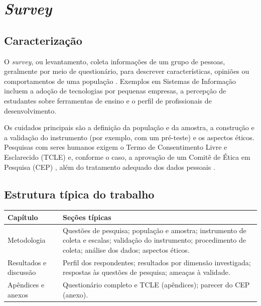 \section{\textit{Survey}}
\label{sec_tipo_survey}

\subsection{Caracterização}

O \textit{survey}, ou levantamento, coleta informações de um grupo de pessoas, geralmente por meio de questionário, para descrever características, opiniões ou comportamentos de uma população \cite{kitchenham2008surveys}. Exemplos em Sistemas de Informação incluem a adoção de tecnologias por pequenas empresas, a percepção de estudantes sobre ferramentas de ensino e o perfil de profissionais de desenvolvimento.

Os cuidados principais são a definição da população e da amostra, a construção e a validação do instrumento (por exemplo, com um pré-teste) e os aspectos éticos. Pesquisas com seres humanos exigem o Termo de Consentimento Livre e Esclarecido (TCLE) e, conforme o caso, a aprovação de um Comitê de Ética em Pesquisa (CEP) \cite{cns2016resolucao510}, além do tratamento adequado dos dados pessoais \cite{brasil2018lgpd}.

\subsection{Estrutura típica do trabalho}

\begin{quadro}[htb]
	\centering
	\caption{Estrutura típica de um TCC de \textit{survey}.}
	\label{qua_estrutura_survey}
	\small
	\begin{tabularx}{\textwidth}{|l|X|}
		\hline
		\textbf{Capítulo} & \textbf{Seções típicas} \\ \hline
		Metodologia & Questões de pesquisa; população e amostra; instrumento de coleta e escalas; validação do instrumento; procedimento de coleta; análise dos dados; aspectos éticos. \\ \hline
		Resultados e discussão & Perfil dos respondentes; resultados por dimensão investigada; respostas às questões de pesquisa; ameaças à validade. \\ \hline
		Apêndices e anexos & Questionário completo e TCLE (apêndices); parecer do CEP (anexo). \\ \hline
	\end{tabularx}
\end{quadro}

